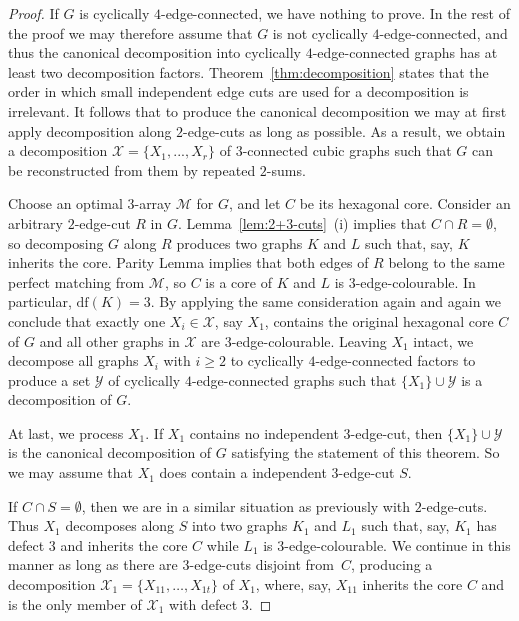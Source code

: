 \documentclass[a4paper]{amsart}
\newcommand{\df}[1]{\ensuremath{\mathrm{df}({#1})}\xspace}
\theoremstyle{plain}
\theoremstyle{definition}
\begin{document}
\begin{proof}
If $G$ is cyclically $4$-edge-connected, we have nothing to
prove. In the rest of the proof we may therefore assume that
$G$ is not cyclically $4$-edge-connected, and thus the
canonical decomposition into cyclically $4$-edge-connected
graphs has at least two decomposition factors.
Theorem~\ref{thm:decomposition} states that the order in which
small independent edge cuts are used for a decomposition is
irrelevant. It follows that to produce the canonical
decomposition we may at first apply decomposition along
$2$-edge-cuts as long as possible. As a result, we obtain a
 decomposition $\mathcal{X}=\{X_1,...,X_r\}$ of
$3$-connected cubic graphs such that $G$ can be reconstructed
from them by repeated $2$-sums.

Choose an optimal $3$-array $\mathcal{M}$ for $G$, and let $C$ be its
hexagonal core. Consider an arbitrary $2$-edge-cut $R$ in $G$.
Lemma~\ref{lem:2+3-cuts}~(i) implies that $C\cap R=\emptyset$,
so decomposing $G$ along $R$ produces two graphs $K$ and $L$ 
such that, say, $K$ inherits the core. Parity Lemma implies that 
both edges of $R$ belong to the same perfect matching from $\mathcal{M}$, 
so $C$ is a core of $K$ and $L$ is $3$-edge-colourable. In
particular, $\df{K}=3$.  By applying the same consideration again 
and again we conclude that
exactly one $X_i\in\mathcal{X}$, say $X_1$, contains the
original hexagonal core $C$ of $G$ and all other graphs in
$\mathcal{X}$ are $3$-edge-colourable. Leaving $X_1$ intact, we
decompose all graphs $X_i$ with $i\ge 2$ to cyclically
$4$-edge-connected factors to produce a set $\mathcal{Y}$ of
cyclically $4$-edge-connected graphs such that
$\{X_1\}\cup\mathcal{Y}$ is a  decomposition of $G$.

At last, we process $X_1$. If $X_1$ contains no independent
$3$-edge-cut, then $\{X_1\}\cup\mathcal{Y}$ is the canonical
decomposition of $G$ satisfying the statement of this theorem.
So we may assume that $X_1$ does contain a independent
$3$-edge-cut $S$.

If $C\cap S=\emptyset$, then we are in a similar situation as
previously with $2$-edge-cuts. Thus $X_1$ decomposes along $S$
into two graphs $K_1$ and $L_1$ such that, say, $K_1$ has
defect $3$ and inherits the core $C$ while $L_1$ is
$3$-edge-colourable. We continue in this manner as long as
there are $3$-edge-cuts disjoint from~$C$, producing a
decomposition $\mathcal{X}_1=\{X_{11},\ldots,X_{1t}\}$ of
$X_1$, where, say, $X_{11}$ inherits the core $C$ and is the
only member of $\mathcal{X}_1$ with defect $3$.


\end{proof}
\end{document}
